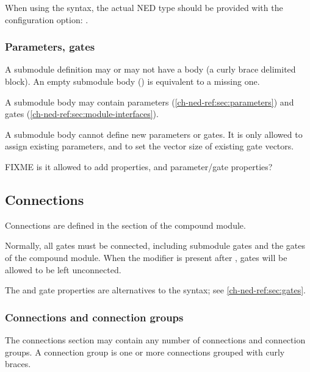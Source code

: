 \begin{note}
    When using the \ttt{<>} syntax, the actual NED type should be
    provided with the  configuration option:
    .
\end{note}

\subsubsection{Parameters, gates}

A submodule definition may or may not have a body (a curly brace
delimited block). An empty submodule body (\ttt{\{ \}}) is equivalent
to a missing one.

A submodule body may contain parameters (\ref{ch-ned-ref:sec:parameters})
and gates (\ref{ch-ned-ref:sec:module-interfaces}).

A submodule body cannot define new parameters or gates. It is only
allowed to assign existing parameters, and to set the vector
size of existing gate vectors.

FIXME is it allowed to add properties, and parameter/gate properties?



\subsection{Connections}
\label{ch-ned-ref:sec:connections}

Connections are defined in the  section of the compound module.

Normally, all gates must be connected, including submodule gates and the gates
of the compound module. When the  modifier is present
after , gates will be allowed to be left unconnected.

\begin{note}
    The  and  gate properties are alternatives to the
     syntax; see \ref{ch-ned-ref:sec:gates}.
\end{note}

\subsubsection{Connections and connection groups}

The connections section may contain any number of connections and
connection groups. A connection group is one or more connections
grouped with curly braces.

